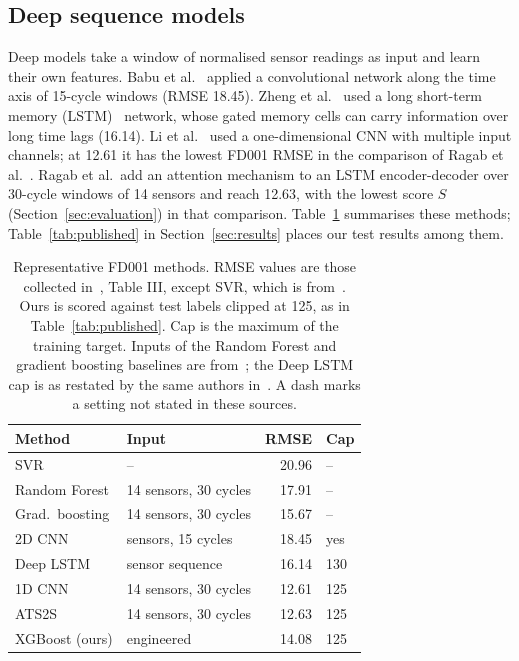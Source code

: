 \subsection{Deep sequence models}
Deep models take a window of normalised sensor readings as input and learn
their own features. Babu et al.~\cite{babu2016cnn} applied a convolutional
network along the time axis of 15-cycle windows (RMSE 18.45). Zheng et
al.~\cite{zheng2017lstm} used a long short-term memory
(LSTM)~\cite{hochreiter1997lstm} network, whose gated memory cells can carry
information over long time lags (16.14). Li et al.~\cite{li2018dcnn}
used a one-dimensional CNN with multiple input channels; at 12.61 it has
the lowest FD001 RMSE in the comparison of Ragab et
al.~\cite{ragab2020attention}. Ragab et al.\ add an attention mechanism
to an LSTM encoder-decoder over 30-cycle windows of 14 sensors and reach
12.63, with the lowest score $S$ (Section~\ref{sec:evaluation}) in that
comparison. Table~\ref{tab:related} summarises these methods;
Table~\ref{tab:published} in Section~\ref{sec:results} places our test
results among them.

\begin{table}[t]
\centering
\caption{Representative FD001 methods. RMSE values are those collected
in~\cite{ragab2020attention}, Table III, except SVR, which is
from~\cite{babu2016cnn}. Ours is scored against test labels clipped at 125,
as in Table~\ref{tab:published}. Cap is the maximum of the training
target. Inputs of the Random Forest and gradient boosting baselines are
from~\cite{zhang2017thesis}; the Deep LSTM cap is as restated by the same
authors in~\cite{wang2019fda}. A dash marks a setting not stated in these
sources.}
\label{tab:related}
\footnotesize
\begin{tabular}{llrl}
\hline
Method & Input & RMSE & Cap \\
\hline
SVR \cite{babu2016cnn}                 & --                    & 20.96 & -- \\
Random Forest \cite{zhang2017modbne}   & 14 sensors, 30 cycles & 17.91 & -- \\
Grad.\ boosting \cite{zhang2017modbne} & 14 sensors, 30 cycles & 15.67 & -- \\
2D CNN \cite{babu2016cnn}              & sensors, 15 cycles    & 18.45 & yes \\
Deep LSTM \cite{zheng2017lstm}         & sensor sequence       & 16.14 & 130 \\
1D CNN \cite{li2018dcnn}               & 14 sensors, 30 cycles & 12.61 & 125 \\
ATS2S \cite{ragab2020attention}        & 14 sensors, 30 cycles & 12.63 & 125 \\
XGBoost (ours)                         & engineered            & 14.08 & 125 \\
\hline
\end{tabular}
\end{table}

